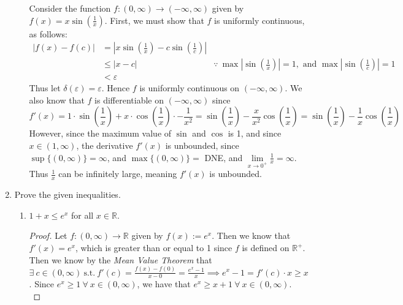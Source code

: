 \documentclass[12pt,letterpaper]{article}
\newcommand{\st}{\ \text{s.t.}\ }
\newcommand{\abs}[1]{\left\lvert #1 \right\rvert}
\newcommand{\R}{\mathbb{R}}
\theoremstyle{case}
\theoremstyle{definition}
\begin{document}
\begin{enumerate}
\begin{enumerate}
			Consider the function $f:(0,\infty) \to (-\infty,\infty)$ given by $f(x)=x\sin\left(\frac{1}{x}\right)$. First, we must show that $f$ is uniformly continuous, as follows:
			\begin{align*}
				|f(x)-f(c)| &= |x\sin\left(\frac{1}{x}\right) - c\sin\left(\frac{1}{c}\right)| \\
				&\leq |x-c| &\because\ \max \abs{\sin\left(\frac{1}{x}\right)}=1,\text{ and } \max\abs{\sin\left(\frac{1}{c}\right)} = 1 \\
				&<\varepsilon
			\end{align*}
			Thus let $\delta(\varepsilon)=\varepsilon$. Hence $f$ is uniformly continuous on $(-\infty, \infty)$. We also know that $f$ is differentiable on $(-\infty,\infty)$ since
			\[f'(x)=1\cdot\sin\left(\frac{1}{x}\right)+x\cdot\cos\left(\frac{1}{x}\right)\cdot -\frac{1}{x^2}= \sin\left(\frac{1}{x}\right)-\frac{x}{x^2}\cos\left(\frac{1}{x}\right)=\sin\left(\frac{1}{x}\right)-\frac{1}{x}\cos\left(\frac{1}{x}\right)\]
			However, since the maximum value of $\sin$ and $\cos$ is 1, and since $x \in (1,\infty)$, the derivative $f'(x)$ is unbounded, since $\sup \{(0,\infty)\} =\infty$, and $\max\{(0,\infty)\}=$ DNE, and $\lim\limits_{x \to 0^+} \frac{1}{x}=\infty$. Thus $\frac{1}{x}$ can be infinitely large, meaning $f'(x)$ is unbounded.\\
		\end{enumerate}
		\item Prove the given inequalities.
		\begin{enumerate}
			\item $1+x \leq e^x$ for all $x \in \R$.
			
			\begin{proof}
				Let $f:(0, \infty) \to \R$ given by $f(x):=e^x$. Then we know that $f'(x)=e^x$, which is greater than or equal to 1 since $f$ is defined on $\R^+$. Then we know by the \textit{Mean Value Theorem} that $\exists\ c \in (0,\infty) \st f'(c)=\frac{f(x)-f(0)}{x-0}=\frac{e^x-1}{x} \implies e^x-1 = f'(c) \cdot x \geq x$. Since $e^x \geq 1\ \forall\ x \in (0,\infty)$, we have that $e^x \geq x+1\ \forall\ x \in (0,\infty)$.\\
				

\end{proof}
\end{enumerate}
\end{enumerate}
\end{document}
